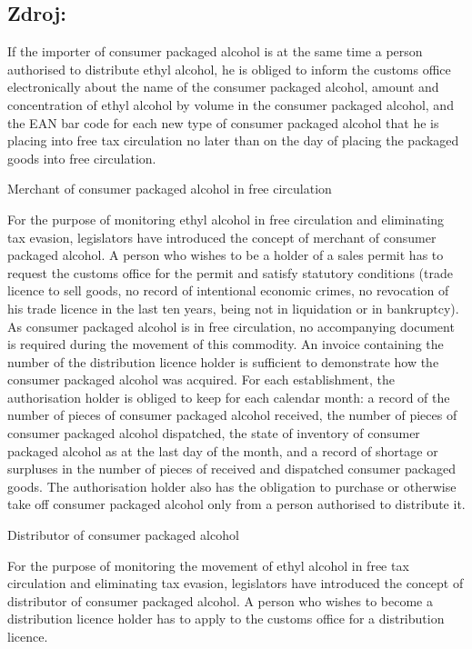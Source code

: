 \documentclass[10pt]{article}
\begin{document}
\subsection*{Zdroj:}

If the importer of consumer packaged alcohol is at the same time a person authorised to distribute ethyl alcohol, he is obliged to inform the customs office electronically about the name of the consumer packaged alcohol, amount and concentration of ethyl alcohol by volume in the consumer packaged alcohol, and the EAN bar code for each new type of consumer packaged alcohol that he is placing into free tax circulation no later than on the day of placing the packaged goods into free circulation.


Merchant of consumer packaged alcohol in free circulation

For the purpose of monitoring ethyl alcohol in free circulation and eliminating tax evasion, legislators have introduced the concept of merchant of consumer packaged alcohol.
A person who wishes to be a holder of a sales permit has to request the customs office for the permit and satisfy statutory conditions (trade licence to sell goods, no record of intentional economic crimes, no revocation of his trade licence in the last ten years, being not in liquidation or in bankruptcy).
As consumer packaged alcohol is in free circulation, no accompanying document is required during the movement of this commodity.
An invoice containing the number of the distribution licence holder is sufficient to demonstrate how the consumer packaged alcohol was acquired.
For each establishment, the authorisation holder is obliged to keep for each calendar month: a record of the number of pieces of consumer packaged alcohol received, the number of pieces of consumer packaged alcohol dispatched, the state of inventory of consumer packaged alcohol as at the last day of the month, and a record of shortage or surpluses in the number of pieces of received and dispatched consumer packaged goods.
The authorisation holder also has the obligation to purchase or otherwise take off consumer packaged alcohol only from a person authorised to distribute it.


Distributor of consumer packaged alcohol

For the purpose of monitoring the movement of ethyl alcohol in free tax circulation and eliminating tax evasion, legislators have introduced the concept of distributor of consumer packaged alcohol.
A person who wishes to become a distribution licence holder has to apply to the customs office for a distribution licence.
\end{document}
